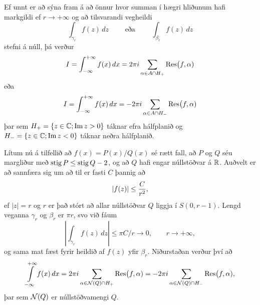 
\noindent
Ef unnt er að sýna fram á að önnur hvor summan í hægri hliðunum hafi
markgildi ef $r\to +\infty$ og að tilsvarandi vegheildi
 $$\int_{\gamma_r}f(z)\, dz \qquad \text{ eða }
\qquad \int_{\beta_r}f(z)\, dz 
 $$
stefni á núll, þá verður
 $$I=\int_{-\infty}\sp{+\infty}f(x)\, dx =
2\pi i\sum_{\alpha\in A\cap H_+}{\operatorname{Res}}\big(f,\alpha)
 $$
eða
 $$I=\int_{-\infty}\sp{+\infty}f(x)\, dx =
-2\pi i\sum_{\alpha\in A\cap H_-}{\operatorname{Res}}\big(f,\alpha)
 $$
þar sem $H_+={\{z\in {\mathbb C}; {\operatorname{Im\, }} z>0\}}$ táknar efra hálfplanið
og $H_-={\{z\in {\mathbb C}; {\operatorname{Im\, }} z<0\}}$ táknar neðra hálfplanið.

Lítum nú á tilfellið að $f(x)=P(x)/Q(x)$ sé rætt fall, að $P$ og $Q$ séu
margliður  með ${\operatorname{stig}}\, P\leq {\operatorname{stig}}\, Q-2$, og að $Q$ hafi engar
núllstöðvar á ${\mathbb R}$.  Auðvelt er að sannfæra sig um að til er fasti
$C$ þannig að
 $$
|f(z)|\leq \dfrac C{r\sp 2},
 $$
ef $|z|=r$ og $r$ er það stórt að allar núllstöðvar $Q$ liggja í
$S(0,r-1)$.  Lengd veganna $\gamma_r$ og $\beta_r$ er $\pi r$, svo
við fáum 
 $$|\int_{\gamma_r}f(z)\, dz|\leq \pi C/r\to 0, \qquad r\to +\infty,
 $$
og sama mat fæst fyrir heildið af $f(z)$ yfir $\beta_r$.  Niðurstaðan
verður því að 
 $$\int\limits_{-\infty}\sp {+\infty} f(x)\, dx =
2\pi i\sum_{\alpha\in {\cal N}(Q)\cap H_+}{\operatorname{Res}}\big(f,\alpha)
=-2\pi i\sum_{\alpha\in {\cal N}(Q)\cap H_-}{\operatorname{Res}}\big(f,\alpha),
 $$
þar sem ${\cal N}(Q)$ er núllstöðvamengi $Q$. 
